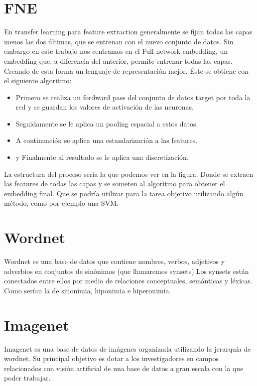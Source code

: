 \documentclass[a4paper,9pt]{extarticle}
\begin{document}
\begin{multicols*}{2}
\section{FNE}

En transfer learning para feature extraction generalmente se fijan todas las capas menos las dos últimas, que se entrenan con el nuevo 
conjunto de datos. Sin embargo en este trabajo nos centramos en el Full-network embedding, un embedding que, a diferencia del anterior, 
permite entrenar todas las capas. Creando de esta forma un lenguaje de representación mejor. 
Éste se obtiene con el siguiente algoritmo: 

\begin{itemize}
\item Primero se realiza un fordward pass del conjunto de datos target por toda la red y se guardan los valores de activación de las neuronas. 
\item Seguidamente se le aplica un pooling espacial a estos datos.
\item A continuación se aplica una estandarización a las features.
\item y Finalmente al resultado se le aplica una discretización. 
\end{itemize}

La estructura del proceso sería la que podemos ver en la figura. Donde se extraen las features de todas las capas y se someten al algoritmo para obtener el
embedding final. Que se podría utilizar para la tarea objetivo utilizando algún método, como por ejemplo una SVM. 
\section{Wordnet}

Wordnet es una base de datos que contiene nombres, verbos, adjetivos y adverbios en conjuntos de
sinónimos (que llamaremos synsets).Los synsets están conectados entre ellos por medio de relaciones
conceptuales, semánticas y léxicas. Como serían la de sinonimia, hiponimia e hiperonimia.
 
\section{Imagenet}
Imagenet es una base de datos de imágenes organizada utilizando la jerarquía de wordnet. Su principal
objetivo es dotar a los investigadores en campos relacionados con visión artificial de una base de datos a gran
escala con la que poder trabajar.


\end{multicols*}
\end{document}
